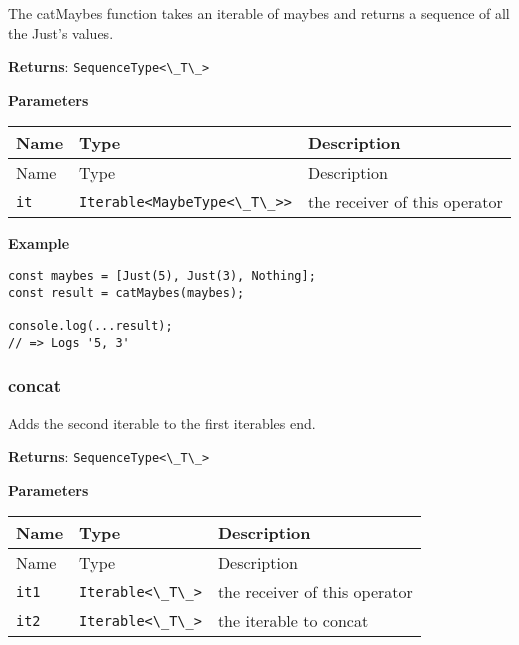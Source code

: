 The catMaybes function takes an iterable of maybes and returns a
sequence of all the Just's values.

\textbf{Returns}: \passthrough{\lstinline!SequenceType<\_T\_>!}

\textbf{Parameters}

\begin{longtable}[]{
  >{\raggedright\arraybackslash}p{}
  >{\raggedright\arraybackslash}p{}
  >{\raggedright\arraybackslash}p{}@{}}
  
\toprule\noalign{}
Name & Type & Description \\
\midrule\noalign{}
\endfirsthead
\toprule\noalign{}
Name & Type & Description \\
\midrule\noalign{}
\endhead
\bottomrule\noalign{}
\endlastfoot
\passthrough{\lstinline!it!} &
\passthrough{\lstinline!Iterable<MaybeType<\_T\_>>!} & the receiver of
this operator \\
\end{longtable}

\textbf{Example}

\begin{lstlisting}[label=c921a7df-d43a-415d-a1b5-9889435c00cf]
const maybes = [Just(5), Just(3), Nothing];
const result = catMaybes(maybes);
                                           
console.log(...result);
// => Logs '5, 3'
\end{lstlisting}

\hypertarget{ff34208c-02f2-42f6-b821-a3deb97e4b1b}{%
\subsubsection{concat}\label{ff34208c-02f2-42f6-b821-a3deb97e4b1b}}

Adds the second iterable to the first iterables end.

\textbf{Returns}: \passthrough{\lstinline!SequenceType<\_T\_>!}

\textbf{Parameters}

\begin{longtable}[]{
  >{\raggedright\arraybackslash}p{}
  >{\raggedright\arraybackslash}p{}
  >{\raggedright\arraybackslash}p{}@{}}
  
\toprule\noalign{}
Name & Type & Description \\
\midrule\noalign{}
\endfirsthead
\toprule\noalign{}
Name & Type & Description \\
\midrule\noalign{}
\endhead
\bottomrule\noalign{}
\endlastfoot
\passthrough{\lstinline!it1!} &
\passthrough{\lstinline!Iterable<\_T\_>!} & the receiver of this
operator \\
\passthrough{\lstinline!it2!} &
\passthrough{\lstinline!Iterable<\_T\_>!} & the iterable to concat \\
\end{longtable}

